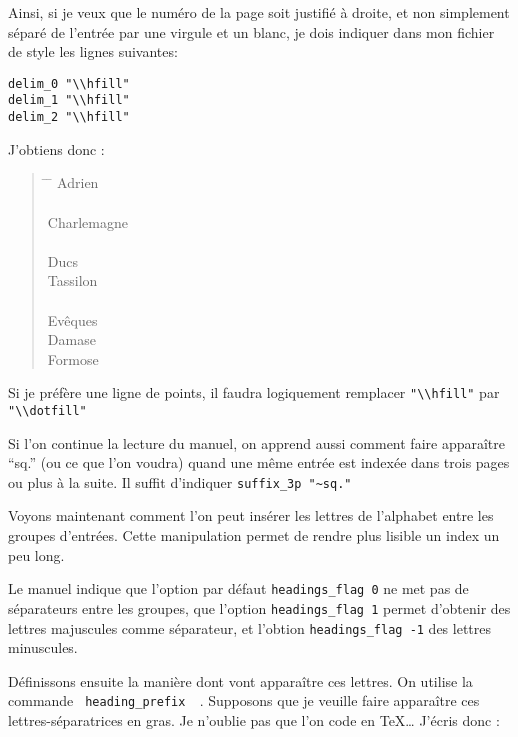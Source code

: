 Ainsi, si je veux que le numéro de la page soit justifié à droite, et non simplement séparé de l'entrée par une virgule et un blanc, je dois indiquer dans mon fichier de style les lignes suivantes:

\begin{verbatim}
delim_0 "\\hfill"
delim_1 "\\hfill"
delim_2 "\\hfill"
\end{verbatim}

J'obtiens donc : 

\begin{quotation}
\begin{tabbing}
\hspace{0,5cm}  \=  \hspace{3cm} \= \kill
Adrien\> \\
\\
Charlemagne \> \\
\\
Ducs \\
\> Tassilon\\
\\
Evêques \\
\> Damase \\
\> Formose\\
\end{tabbing}
\end{quotation}

Si je préfère une ligne de points, il faudra logiquement remplacer \verb|"\\hfill"| par \verb+"\\dotfill"+


Si l'on continue la lecture du manuel, on apprend aussi comment faire apparaître \enquote{sq.} (ou ce que l'on voudra) quand une même entrée est indexée dans trois pages ou plus à la suite. Il suffit d'indiquer \verb+suffix_3p "~sq."+

Voyons maintenant comment l'on peut insérer les lettres de l'alphabet entre les groupes d'entrées. Cette manipulation permet de rendre plus lisible un index un peu long. 

Le manuel indique que l'option par défaut \verb+headings_flag 0+ ne met pas de séparateurs entre les groupes, que l'option \verb+headings_flag 1+ permet d'obtenir des lettres majuscules comme séparateur, et l'obtion  \verb+headings_flag -1+ des lettres minuscules.

Définissons ensuite la manière dont vont apparaître ces lettres. On utilise la commande \verb| heading_prefix  |. Supposons que je veuille faire apparaître ces lettres-séparatrices en gras. Je n'oublie pas que l'on code en \TeX … J'écris donc :


